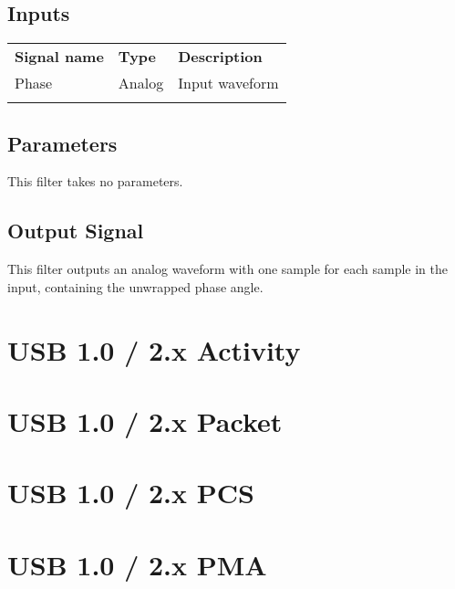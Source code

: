 \subsection{Inputs}

\begin{tabularx}{16cm}{llX}
\thickhline
\textbf{Signal name} & \textbf{Type} & \textbf{Description} \\
\thickhline
Phase & Analog & Input waveform \\
\thickhline
\end{tabularx}

\subsection{Parameters}

This filter takes no parameters.

\subsection{Output Signal}

This filter outputs an analog waveform with one sample for each sample in the input, containing the unwrapped phase
angle.

\pagebreak
\section{USB 1.0 / 2.x Activity}

\pagebreak
\section{USB 1.0 / 2.x Packet}

\pagebreak
\section{USB 1.0 / 2.x PCS}

\pagebreak
\section{USB 1.0 / 2.x PMA}

